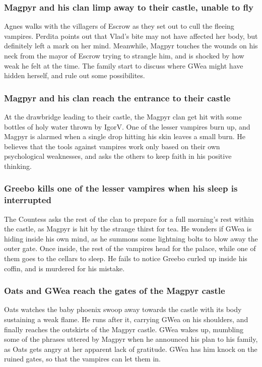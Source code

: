 \subsubsection{\Gls{Magpyr} and his clan limp away to their castle, unable to fly}
\Gls{Agnes} walks with the villagers of Escrow as they set out to cull the fleeing vampires.
\Gls{Perdita} points out that \Gls{Vlad}'s bite may not have affected her body, but definitely
left a mark on her mind. Meanwhile, \Gls{Magpyr} touches the wounds on his neck from the mayor
of Escrow trying to strangle him, and is shocked by how weak he felt at the time. The family
start to discuss where \Gls{GWea} might have hidden herself, and rule out some possibilites.

\subsubsection{\Gls{Magpyr} and his clan reach the entrance to their castle}
At the drawbridge leading to their castle, the \Gls{Magpyr} clan get hit with some bottles of
holy water thrown by \Gls{IgorV}. One of the lesser vampires burn up, and \Gls{Magpyr} is alarmed
when a single drop hitting his skin leaves a small burn. He believes that the tools against vampires
work only based on their own psychological weaknesses, and asks the others to keep faith in his
positive thinking.

\subsubsection{\Gls{Greebo} kills one of the lesser vampires when his sleep is interrupted}
The \Gls{Countess} asks the rest of the clan to prepare for a full morning's rest within the castle,
as \Gls{Magpyr} is hit by the strange thirst for tea. He wonders if \Gls{GWea} is hiding inside
his own mind, as he summons some lightning bolts to blow away the outer gate. Once inside, the
rest of the vampires head for the palace, while one of them goes to the cellars to sleep. He
fails to notice \Gls{Greebo} curled up inside his coffin, and is murdered for his mistake.

\subsubsection{\Gls{Oats} and \Gls{GWea} reach the gates of the Magpyr castle}
\Gls{Oats} watches the baby phoenix swoop away towards the castle with its body sustaining a weak
flame. He runs after it, carrying \Gls{GWea} on his shoulders, and finally reaches the outskirts
of the Magpyr castle. \Gls{GWea} wakes up, mumbling some of the phrases uttered by \Gls{Magpyr}
when he announced his plan to his family, as \Gls{Oats} gets angry at her apparent lack of
gratitude. \Gls{GWea} has him knock on the ruined gates, so that the vampires can let them in.


